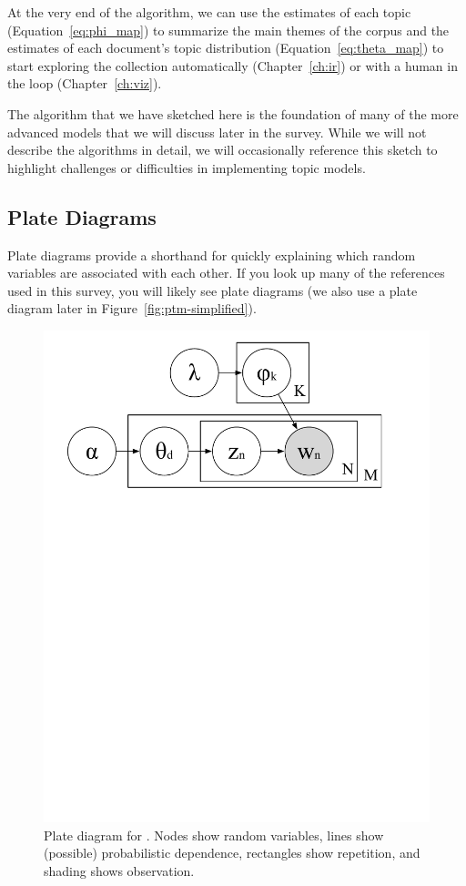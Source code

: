 At the very end of the algorithm, we can use the estimates of each topic
(Equation~\ref{eq:phi_map}) to summarize the main themes of the corpus and the
estimates of each document's topic distribution (Equation~\ref{eq:theta_map}) to
start exploring the collection automatically (Chapter~\ref{ch:ir}) or with a
human in the loop (Chapter~\ref{ch:viz}).

The algorithm that we have sketched here is the foundation of many of the more
advanced models that we will discuss later in the survey.  While we will not describe
the algorithms in detail, we will occasionally reference this sketch to
highlight challenges or difficulties in implementing topic models.

\subsection{Plate Diagrams}
\label{sec:plate}

Plate diagrams provide a shorthand for quickly explaining which random
variables are associated with each other.  If you look up many of the
references used in this survey, you will likely see plate diagrams (we
also use a plate diagram later in Figure~\ref{fig:ptm-simplified}).

\begin{figure}
  \begin{center}
  \includegraphics[width=0.7\linewidth]{figures/lda_plate}
  \end{center}
  \caption{Plate diagram for .  Nodes show random variables,
    lines show (possible) probabilistic dependence, rectangles show
    repetition, and shading shows observation.}
  \label{fig:plate-lda}
\end{figure}

